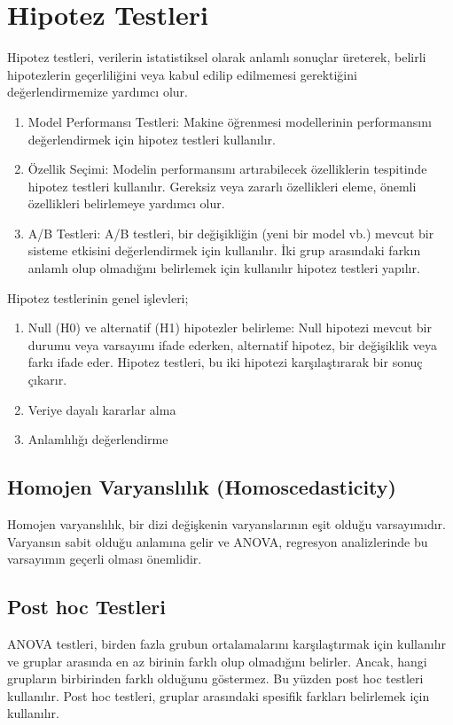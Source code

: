 \section{Hipotez Testleri}
Hipotez testleri, verilerin istatistiksel olarak anlamlı sonuçlar üreterek, belirli hipotezlerin geçerliliğini veya kabul edilip edilmemesi gerektiğini değerlendirmemize yardımcı olur.

\begin{enumerate}
    \item Model Performansı Testleri: Makine öğrenmesi modellerinin performansını değerlendirmek için hipotez testleri kullanılır.
    \item Özellik Seçimi: Modelin performansını artırabilecek özelliklerin tespitinde hipotez testleri kullanılır. Gereksiz veya zararlı özellikleri eleme, önemli özellikleri belirlemeye yardımcı olur.
    \item A/B Testleri: A/B testleri, bir değişikliğin (yeni bir model vb.) mevcut bir sisteme etkisini değerlendirmek için kullanılır. İki grup arasındaki farkın anlamlı olup olmadığını belirlemek için kullanılır hipotez testleri yapılır.
\end{enumerate}
Hipotez testlerinin genel işlevleri;
\begin{enumerate}
    \item Null (H0) ve alternatif (H1) hipotezler belirleme: Null hipotezi mevcut bir durumu veya varsayımı ifade ederken, alternatif hipotez, bir değişiklik veya farkı ifade eder. Hipotez testleri, bu iki hipotezi karşılaştırarak bir sonuç çıkarır.
    \item Veriye dayalı kararlar alma
    \item Anlamlılığı değerlendirme
\end{enumerate}

\subsection{Homojen Varyanslılık (Homoscedasticity)}
Homojen varyanslılık, bir dizi değişkenin varyanslarının eşit olduğu varsayımıdır. Varyansın sabit olduğu anlamına gelir ve ANOVA, regresyon analizlerinde bu varsayımın geçerli olması önemlidir. 

\subsection{Post hoc Testleri}
ANOVA testleri, birden fazla grubun ortalamalarını karşılaştırmak için kullanılır ve gruplar arasında en az birinin farklı olup olmadığını belirler. Ancak, hangi grupların birbirinden farklı olduğunu göstermez. Bu yüzden post hoc testleri kullanılır. Post hoc testleri, gruplar arasındaki spesifik farkları belirlemek için kullanılır.


